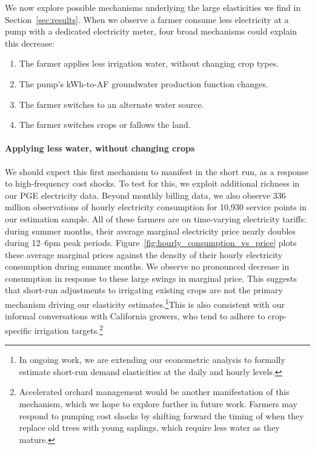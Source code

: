 %
%
We now explore possible mechanisms underlying the large elasticities we find in Section~\ref{sec:results}. When we observe a farmer consume less electricity at a pump with a dedicated electricity meter, four broad mechanisms could explain this decrease:
\begin{enumerate}
	\item The farmer applies less irrigation water, without changing crop types.
	\item The pump's kWh-to-AF groundwater production function changes.
	\item The farmer switches to an alternate water source.
	\item The farmer switches crops or fallows the land. 
\end{enumerate}

\paragraph{Applying less water, without changing crops}
We should expect this first mechanism to manifest in the short run, as a response to high-frequency cost shocks. To test for this, we exploit additional richness in our PGE electricity data. Beyond monthly billing data, we also observe 336 million observations of hourly electricity consumption for 10,930 service points in our estimation sample. All of these farmers are on time-varying electricity tariffs: during summer months, their average marginal electricity price nearly doubles during 12--6pm peak periods. Figure~\ref{fig:hourly_consumption_vs_price} plots these average marginal prices against the density of their hourly electricity consumption during summer months. We observe no pronounced decrease in consumption in response to these large swings in marginal price. This suggests that short-run adjustments to irrigating existing crops are not the primary mechanism driving our elasticity estimates.\footnote{In ongoing work, we are extending our econometric analysis to formally estimate short-run demand elasticities at the daily and hourly levels.}This is also consistent with our informal conversations with California growers, who tend to adhere to crop-specific irrigation targets.\footnote{Accelerated orchard management would be another manifestation of this mechanism, which we hope to explore further in future work. Farmers may respond to pumping cost shocks by shifting forward the timing of when they replace old trees with young saplings, which require less water as they mature.}


